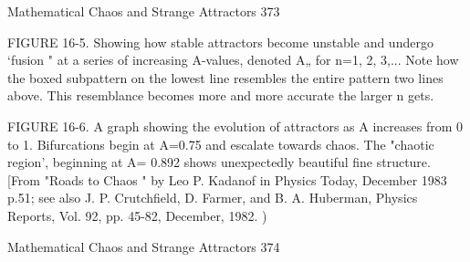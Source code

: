 Mathematical Chaos and Strange Attractors                                              373

FIGURE 16-5. Showing how stable attractors become unstable and undergo `fusion "
at a series of increasing A-values, denoted A„ for n=1, 2, 3,... Note how the boxed
subpattern on the lowest line resembles the entire pattern two lines above. This
resemblance becomes more and more accurate the larger n gets.

FIGURE 16-6. A graph showing the evolution of attractors as A increases from 0 to
1. Bifurcations begin at A=0.75 and escalate towards chaos. The "chaotic region',
beginning at A= 0.892 shows unexpectedly beautiful fine structure. [From "Roads to
Chaos " by Leo P. Kadanof in Physics Today, December 1983 p.51; see also J. P.
Crutchfield, D. Farmer, and B. A. Huberman, Physics Reports, Vol. 92, pp. 45-82,
December, 1982. )




Mathematical Chaos and Strange Attractors                                      374

